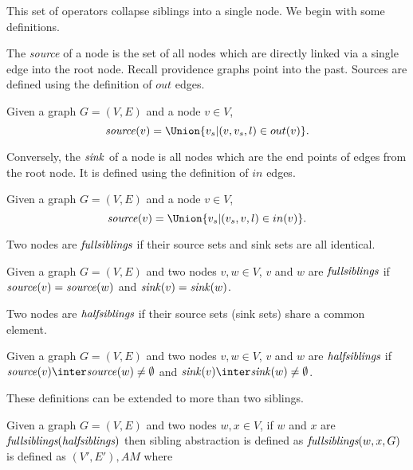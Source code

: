 \documentclass{elsarticle}
\begin{document}
This set of operators collapse siblings into a single node. We begin with some definitions.

The \emph{source} of a node is the set of all nodes which are directly linked via a single edge into the root node.  Recall providence graphs point into the past. Sources are defined using the definition of $out$ edges. 

\begin{definition}[$\source$] \label{def:source}
  Given a graph $G = (V,E)$ and a node $v \in V$,
  \[
  \source(v) = \Union\{v_s|(v,v_s,l) \in out(v)\}.
  \]
\end{definition}

Conversely, the $\sink$ of a node is all nodes which are the end points of edges from the root node.  It is defined using the definition of $in$ edges.

\begin{definition}[$\sink$] \label{def:sink}
  Given a graph $G = (V,E)$ and a node $v \in V$,
  \[
  \source(v) = \Union\{v_s|(v_s,v,l) \in in(v)\}.
  \]
\end{definition}

Two nodes are $\fullsiblings$ if their source sets and sink sets are all identical.  

\begin{definition}[$\fullsiblings$] \label{def:fullsiblings}
  Given a graph $G = (V,E)$ and two nodes $v,w \in V$, $v$ and $w$ are $\fullsiblings$ if $\mathit{source}(v) = \mathit{source}(w)$ and $\mathit{sink}(v) = \mathit{sink}(w)$. 
\end{definition}

Two nodes are $\halfsiblings$ if their source sets (sink sets) share a common element.  

\begin{definition}[$\halfsiblings$] \label{def:halfsiblings}
  Given a graph $G = (V,E)$ and two nodes $v,w \in V$, $v$ and $w$ are $\halfsiblings$ if $\source(v) \inter \source(w) \ne \emptyset$ and $\sink(v) \inter \sink(w) \ne \emptyset$. 
\end{definition}

These definitions can be extended to more than two siblings. 


\begin{definition}[\sibabs]\label{def:sibling-abstraction}
  Given a graph $G = (V,E)$ and two nodes $w,x \in V$, if $w$ and $x$ are  $\emph{fullsiblings}(\emph{halfsiblings})$ then sibling abstraction is defined as $\emph{fullsiblings}(w,x,G)$ is defined as $(V',E'),AM$ where
\end{definition}
\end{document}
